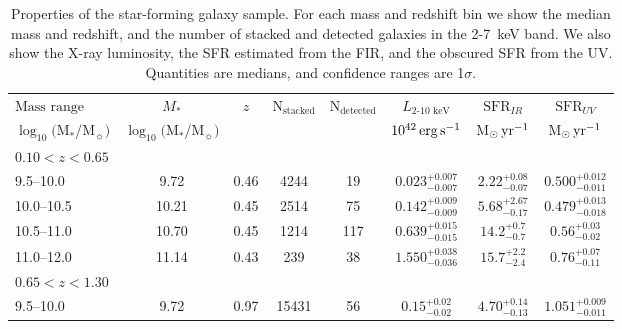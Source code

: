 \begin{table*}\centering
\caption{Properties of the star-forming galaxy sample. For each mass and redshift bin we show the median mass and redshift, and the number of stacked and detected galaxies in the 2-7~keV band.
We also show the X-ray luminosity, the SFR estimated from the FIR, and the obscured SFR from the UV. Quantities are medians, and confidence ranges are 1$\sigma$.}
\vspace{5pt}
\label{tab:SF_prop}
\begin{tabular}{lc|c|c c|c c c}
\hline
\hline
$\text{Mass range}$                             & $M_*$ &  $z$  & N$_{\text{stacked}}$  & N$_{\text{detected}}$ & $L_{\text{2-10~keV}}$   & $\text{SFR}_{IR}$ & $\text{SFR}_{UV}$  \\     %
$\log_{10}($M$_*$/M$_\sun)$     & $\log_{10}($M$_*$/M$_\sun)$   & &     &                       & $10^{42}\,\mathrm{erg}\,\mathrm{s}^{-1}$    & M$_\odot \,\mathrm{yr}^{-1}$        & M$_\odot \,\mathrm{yr}^{-1}$\\ %
\hline
\hline
\multicolumn{8}{l}{$0.10<z<0.65$}       \\
\hline
9.5--10.0               &  9.72    & 0.46       & 4244  & 19    & $0.023^{+0.007}_{-0.007}$     & $ 2.22^{+0.08}_{-0.07}$ & $0.500^{+0.012}_{-0.011}$             \T \B \\    
10.0--10.5          & 10.21    & 0.45   & 2514  & 75    & $0.142^{+0.009}_{-0.009}$     & $ 5.68^{+2.67}_{-0.17}$ & $0.479^{+0.013}_{-0.018}$             \T \B \\     
10.5--11.0              & 10.70    & 0.45       & 1214  & 117   & $0.639^{+0.015}_{-0.015}$     & $14.2 ^{+0.7 }_{-0.7 }$ & $0.56 ^{+0.03 }_{-0.02 }$             \T \B \\      
11.0--12.0          & 11.14    & 0.43   & 239   & 38    & $1.550^{+0.038}_{-0.036}$     & $15.7 ^{+2.2 }_{-2.4 }$ & $0.76 ^{+0.07 }_{-0.11 }$             \T \B \\       
\hline
\hline
\multicolumn{8}{l}{$0.65<z<1.30$}        \\
\hline
9.5--10.0               &  9.72   & 0.97        & 15431 & 56    & $ 0.15^{+0.02}_{-0.02} $       & $ 4.70^{+0.14}_{-0.13}$       & $1.051^{+0.009}_{-0.011} $    \T \B \\   

\end{tabular}
\end{table*}
